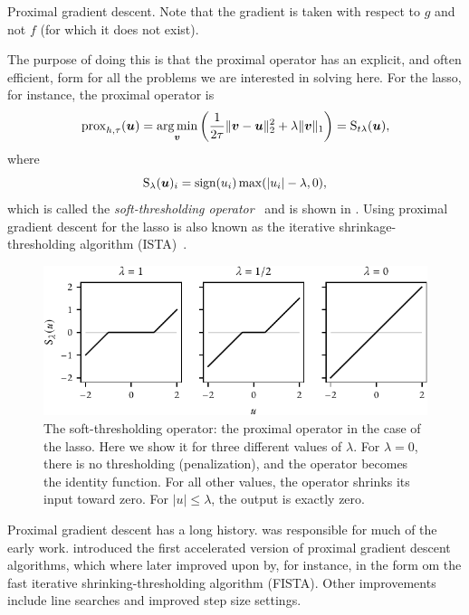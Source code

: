 \begin{algorithm}[hbtp]
  \caption{Proximal gradient descent. Note that the gradient is taken with respect to \(g\) and not \(f\) (for which it does not exist).}
  \label{alg:pgd}
\end{algorithm}

The purpose of doing this is that the proximal operator has an explicit, and often efficient, form for all the problems we are interested in solving here. For the lasso, for instance, the proximal operator is
\[
  \operatorname{prox}_{h,\tau}(\boldsymbol{u})  = \operatorname*{arg\,min}_{\boldsymbol{v}} \left( \frac{1}{2\tau}\lVert \boldsymbol{v} - \boldsymbol{u}\rVert_2^2 + \lambda \lVert \boldsymbol{v} \rVert_1 \right)
  = \operatorname{S}_{t\lambda}(\boldsymbol{u}),
\]
where
\[
  \operatorname{S}_{\lambda}(\boldsymbol{u})_i = \operatorname{sign}(u_i)\max(\lvert u_i \rvert - \lambda, 0),
\]
which is called the \emph{soft-thresholding operator}~\parencite{donoho1995} and is shown in . Using proximal gradient descent for the lasso is also known as the iterative shrinkage-thresholding algorithm (ISTA)~\parencite{beck2009}.

\begin{figure}[htpb]
  \centering
  \includegraphics[]{figures/soft-thresholding.pdf}
  \caption{%
    The soft-thresholding operator: the proximal operator in the case of the lasso. Here we show it for three different values of \(\lambda\). For \(\lambda = 0\), there is no thresholding (penalization), and the operator becomes the identity function. For all other values, the operator shrinks its input toward zero. For \(|u| \leq \lambda\), the output is exactly zero.
  }
  \label{fig:soft-thresholding}
\end{figure}

Proximal gradient descent has a long history. \textcite{rockafellar1970} was responsible for much of the early work. \textcite{nesterov1983} introduced the first accelerated version of proximal gradient descent algorithms, which where later improved upon by, for instance, \textcite{beck2009} in the form om the fast iterative shrinking-thresholding algorithm (FISTA). Other improvements include line searches and improved step size settings.

